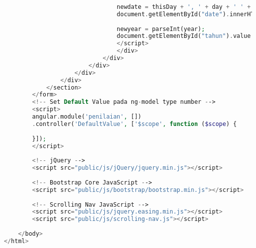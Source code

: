 \begin{lstlisting}[language=PHP,basicstyle=\tiny,caption=skripsi.php]
								
								newdate = thisDay + ', ' + day + ' ' + months[month] + ' ' + year;
								document.getElementById("date").innerHTML = newdate;
								
								newyear = parseInt(year);
								document.getElementById("tahun").value = newyear;
								</script>
								</div>
							</div>
						</div>
					</div>
				</div>
			</section>	
		</form>
		<!-- Set Default Value pada ng-model type number -->
		<script>
		angular.module('penilaian', [])
		.controller('DefaultValue', ['$scope', function ($scope) {
		
		}]);
		</script>
		
		<!-- jQuery -->
		<script src="public/js/jQuery/jquery.min.js"></script>
		
		<!-- Bootstrap Core JavaScript -->
		<script src="public/js/bootstrap/bootstrap.min.js"></script>
		
		<!-- Scrolling Nav JavaScript -->
		<script src="public/js/jquery.easing.min.js"></script>
		<script src="public/js/scrolling-nav.js"></script>
		
	</body>
</html>
\end{lstlisting}

